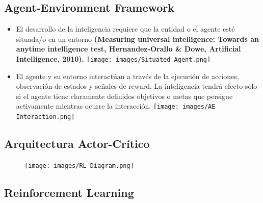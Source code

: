 \documentclass[11pt]{article}
\begin{document}
    \subsection{Agent-Environment
Framework}\label{agent-environment-framework}

\begin{itemize}
\item
  El desarrollo de la inteligencia requiere que la entidad o el agente
  esté situada/o en un entorno \textbf{(Measuring universal
  intelligence: Towards an anytime intelligence test, Hernandez-Orallo
  \& Dowe, Artificial Intelligence, 2010).}
  \texttt{[image: images/Situated Agent.png]}
\item
  El agente y su entorno interactúan a través de la ejecución de
  acciones, observación de estados y señales de reward. La inteligencia
  tendrá efecto sólo si el agente tiene claramente definidos objetivos o
  metas que persigue activamente mientras ocurre la interacción.
  \texttt{[image: images/AE Interaction.png]}
\end{itemize}

    \subsection{Arquitectura
Actor-Crítico}\label{arquitectura-actor-cruxedtico}

\begin{figure}
\centering
\texttt{[image: images/RL Diagram.png]}
\caption{}
\end{figure}

    \subsection{Reinforcement Learning}\label{reinforcement-learning}
\end{document}
